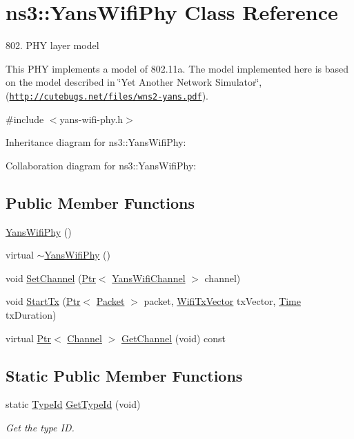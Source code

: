 \hypertarget{classns3_1_1YansWifiPhy}{}\section{ns3\+:\+:Yans\+Wifi\+Phy Class Reference}
\label{classns3_1_1YansWifiPhy}


802. P\+HY layer model

This P\+HY implements a model of 802.\+11a. The model implemented here is based on the model described in \char`\"{}\+Yet Another Network Simulator\char`\"{}, (\href{http://cutebugs.net/files/wns2-yans.pdf}{\tt http\+://cutebugs.\+net/files/wns2-\/yans.\+pdf}).  




{\ttfamily \#include $<$yans-\/wifi-\/phy.\+h$>$}



Inheritance diagram for ns3\+:\+:Yans\+Wifi\+Phy\+:


Collaboration diagram for ns3\+:\+:Yans\+Wifi\+Phy\+:
\subsection*{Public Member Functions}
\begin{DoxyCompactItemize}
\item 
\hyperlink{classns3_1_1YansWifiPhy_a0b6127d76f42dbbfb342283dbb7e55b6}{Yans\+Wifi\+Phy} ()
\item 
virtual \hyperlink{classns3_1_1YansWifiPhy_aa93aade36c147ea4c8cfbe8d2b6bb17a}{$\sim$\+Yans\+Wifi\+Phy} ()
\item 
void \hyperlink{classns3_1_1YansWifiPhy_ad2eeb0ab17ef01b26436f7110cccff1d}{Set\+Channel} (\hyperlink{classns3_1_1Ptr}{Ptr}$<$ \hyperlink{classns3_1_1YansWifiChannel}{Yans\+Wifi\+Channel} $>$ channel)
\item 
void \hyperlink{classns3_1_1YansWifiPhy_ae62dc3e0badd99c6d78c978413ff5c11}{Start\+Tx} (\hyperlink{classns3_1_1Ptr}{Ptr}$<$ \hyperlink{classns3_1_1Packet}{Packet} $>$ packet, \hyperlink{classns3_1_1WifiTxVector}{Wifi\+Tx\+Vector} tx\+Vector, \hyperlink{classns3_1_1Time}{Time} tx\+Duration)
\item 
virtual \hyperlink{classns3_1_1Ptr}{Ptr}$<$ \hyperlink{classns3_1_1Channel}{Channel} $>$ \hyperlink{classns3_1_1YansWifiPhy_aad8c92208e6fc478e4adc9c43292f272}{Get\+Channel} (void) const 
\end{DoxyCompactItemize}
\subsection*{Static Public Member Functions}
\begin{DoxyCompactItemize}
\item 
static \hyperlink{classns3_1_1TypeId}{Type\+Id} \hyperlink{classns3_1_1YansWifiPhy_aa1af985afb271ba6bc4dcc41badf5cc6}{Get\+Type\+Id} (void)
\begin{DoxyCompactList}\small\item\em Get the type ID. \end{DoxyCompactList}\end{DoxyCompactItemize}
